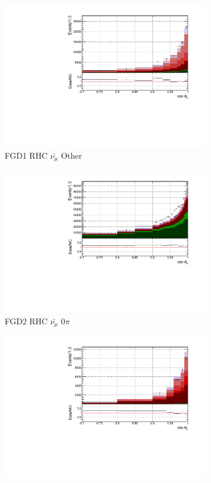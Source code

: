 \begin{figure}
\begin{subfigure}{.32\textwidth}
  \includegraphics[width=0.95\linewidth]{figs/FGD1_anti-numuCC_other_t}
  \caption{FGD1 RHC $\bar{\nu_{\mu}}$ Other}
  \label{fig:tstack_FGD1_anti-numuCC_other}
\end{subfigure}
\centering
\begin{subfigure}{.32\textwidth}
  \centering
  \includegraphics[width=0.95\linewidth]{figs/FGD2_anti-numuCC_0pi_t}
  \caption{FGD2 RHC $\bar{\nu_{\mu}}$ 0$\pi$}
  \label{fig:tstack_FGD2_anti-numuCC_0pi}
\end{subfigure}
\begin{subfigure}{.32\textwidth}
  \centering
  \includegraphics[width=0.95\linewidth]{figs/FGD2_anti-numuCC_1pi_t}

\end{subfigure}
\end{figure}
